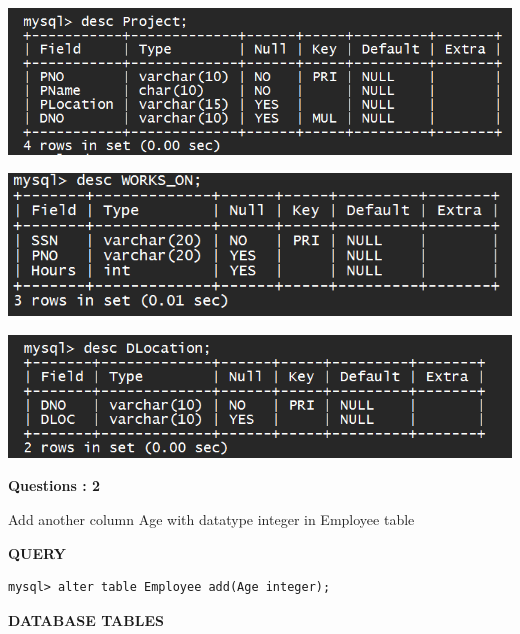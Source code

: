 \documentclass[a4paper,12pt]{report}
\begin{document}
    \vspace{10mm}
    \includegraphics[scale=0.7]{project.png}
    \vspace{10mm}
    
    \includegraphics[scale=0.7]{works.png}
    \vspace{10mm}
 
    \includegraphics[scale=0.7]{location.png}
	

\begin{flushleft}
    \textbf{Questions : 2}
\end{flushleft}
Add another column Age with datatype integer in Employee table
\begin{flushleft}
		\textbf{QUERY }
	\end{flushleft}
\begin{verbatim}
mysql> alter table Employee add(Age integer);
\end{verbatim}
\newpage
\begin{flushleft}
		\textbf{DATABASE TABLES}
\end{flushleft} 
\end{document}
